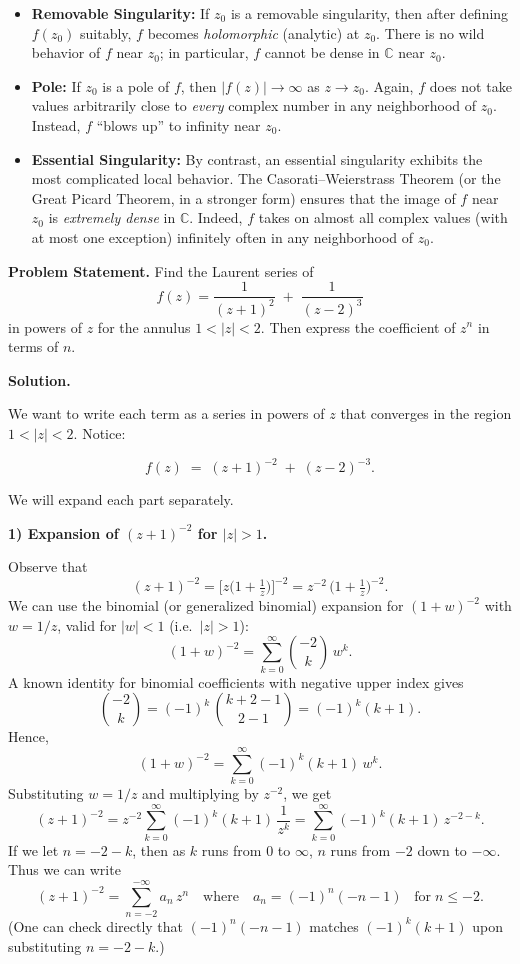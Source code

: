 \documentclass[12pt]{article}
\theoremstyle{definition} %
\theoremstyle{plain} %
\begin{document}
\begin{itemize}
\item \textbf{Removable Singularity:} If $z_0$ is a removable singularity, then after defining $f(z_0)$ suitably, $f$ becomes \emph{holomorphic} (analytic) at $z_0$. There is no wild behavior of $f$ near $z_0$; in particular, $f$ cannot be dense in $\mathbb{C}$ near $z_0$.
\item \textbf{Pole:} If $z_0$ is a pole of $f$, then $|f(z)| \to \infty$ as $z \to z_0$. Again, $f$ does not take values arbitrarily close to \emph{every} complex number in any neighborhood of $z_0$. Instead, $f$ ``blows up'' to infinity near $z_0$.
\item \textbf{Essential Singularity:} By contrast, an essential singularity exhibits the most complicated local behavior. The Casorati--Weierstrass Theorem (or the Great Picard Theorem, in a stronger form) ensures that the image of $f$ near $z_0$ is \emph{extremely dense} in $\mathbb{C}$. Indeed, $f$ takes on almost all complex values (with at most one exception) infinitely often in any neighborhood of $z_0$.
\end{itemize}


\textbf{Problem Statement.} 
Find the Laurent series of 
\[
f(z) = \frac{1}{(z+1)^2} \;+\; \frac{1}{(z-2)^3}
\]
in powers of $z$ for the annulus $1 < |z| < 2$. Then express the coefficient of $z^n$ in terms of $n$.

\medskip

\textbf{Solution.}

We want to write each term as a series in powers of $z$ that converges in the region $1 < |z| < 2$. Notice:

\[
f(z) \;=\; (z+1)^{-2} \;+\; (z-2)^{-3}.
\]

We will expand each part separately.

\medskip

\noindent
\textbf{1) Expansion of $(z+1)^{-2}$ for $|z| > 1$.}

Observe that
\[
(z+1)^{-2}
= \bigl[z\bigl(1 + \tfrac{1}{z}\bigr)\bigr]^{-2}
= z^{-2} \,\bigl(1 + \tfrac{1}{z}\bigr)^{-2}.
\]
We can use the binomial (or generalized binomial) expansion for $(1 + w)^{-2}$ with $w = 1/z$, valid for $|w|<1$ (i.e.\ $|z|>1$):
\[
(1 + w)^{-2}
= \sum_{k=0}^{\infty} \binom{-2}{k} \, w^k.
\]
A known identity for binomial coefficients with negative upper index gives
\[
\binom{-2}{k} 
= (-1)^k \,\binom{k + 2 - 1}{2 - 1}
= (-1)^k (k+1).
\]
Hence,
\[
(1 + w)^{-2}
= \sum_{k=0}^{\infty} (-1)^k (k+1)\, w^k.
\]
Substituting $w = 1/z$ and multiplying by $z^{-2}$, we get
\[
(z+1)^{-2}
= z^{-2} \sum_{k=0}^{\infty} (-1)^k (k+1)\,\frac{1}{z^k}
= \sum_{k=0}^{\infty} (-1)^k (k+1)\, z^{-2 - k}.
\]
If we let $n = -2 - k$, then as $k$ runs from $0$ to $\infty$, $n$ runs from $-2$ down to $-\infty$. Thus we can write
\[
(z+1)^{-2}
= \sum_{n=-2}^{-\infty} a_n\, z^n
\quad\text{where}\quad
a_n = (-1)^n(-n-1)
\;\;\;\text{for}\;n \le -2.
\]
(One can check directly that $(-1)^n(-n-1)$ matches $(-1)^k(k+1)$ upon substituting $n=-2-k$.)
\end{document}
